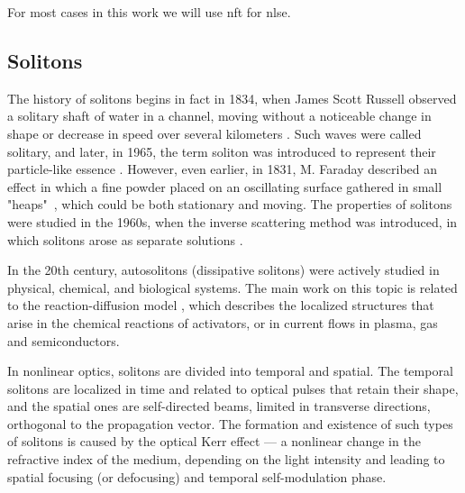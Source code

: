 

For most cases in this work we will use \acrshort{nft} for \acrshort{nlse}.


\subsection{Solitons}
The history of solitons begins in fact in 1834, when James Scott Russell observed a solitary shaft of water in a channel, moving without a noticeable change in shape or decrease in speed over several kilometers \cite{scott1844}. Such waves were called solitary, and later, in 1965, the term soliton was introduced to represent their particle-like essence \cite{zabusky1965}. However, even earlier, in 1831, M. Faraday \cite{faraday1831} described an effect in which a fine powder placed on an oscillating surface gathered in small "heaps"\ , which could be both stationary and moving. The properties of solitons were studied in the 1960s, when the inverse scattering method was introduced, in which solitons arose as separate solutions \cite{gardner1967}.

In the 20th century, autosolitons (dissipative solitons) were actively studied in physical, chemical, and biological systems. The main work on this topic is related to the reaction-diffusion model \cite{vasilyev1987en, kerner1991en}, which describes the localized structures that arise in the chemical reactions of activators, or in current flows in plasma, gas and semiconductors.

In nonlinear optics, solitons are divided into temporal and spatial. The temporal solitons are localized in time and related to optical pulses that retain their shape, and the spatial ones are self-directed beams, limited in transverse directions, orthogonal to the propagation vector. The formation and existence of such types of solitons is caused by the optical Kerr effect \cite{shen1984, butcher1990, boyd1992} --- a nonlinear change in the refractive index of the medium, depending on the light intensity and leading to spatial focusing (or defocusing) and temporal self-modulation phase.

